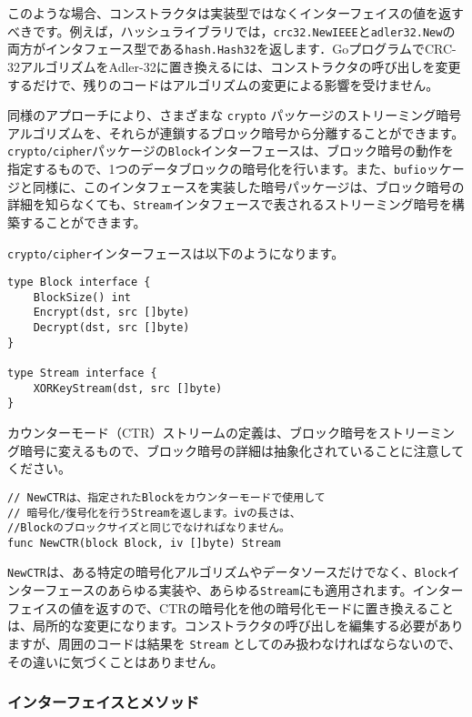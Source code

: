 \documentclass{jsarticle}
\begin{document}
このような場合、コンストラクタは実装型ではなくインターフェイスの値を返すべきです。例えば，ハッシュライブラリでは，\texttt{crc32.NewIEEE}と\texttt{adler32.New}の両方がインタフェース型である\texttt{hash.Hash32}を返します．GoプログラムでCRC-32アルゴリズムをAdler-32に置き換えるには、コンストラクタの呼び出しを変更するだけで、残りのコードはアルゴリズムの変更による影響を受けません。

同様のアプローチにより、さまざまな \texttt{crypto}
パッケージのストリーミング暗号アルゴリズムを、それらが連鎖するブロック暗号から分離することができます。\texttt{crypto/cipher}パッケージの\texttt{Block}インターフェースは、ブロック暗号の動作を指定するもので、1つのデータブロックの暗号化を行います。また、\texttt{bufio}ッケージと同様に、このインタフェースを実装した暗号パッケージは、ブロック暗号の詳細を知らなくても、\texttt{Stream}インタフェースで表されるストリーミング暗号を構築することができます。

\texttt{crypto/cipher}インターフェースは以下のようになります。

\begin{lstlisting}[numbers=none]
type Block interface {
    BlockSize() int
    Encrypt(dst, src []byte)
    Decrypt(dst, src []byte)
}

type Stream interface {
    XORKeyStream(dst, src []byte)
}
\end{lstlisting}

カウンターモード（CTR）ストリームの定義は、ブロック暗号をストリーミング暗号に変えるもので、ブロック暗号の詳細は抽象化されていることに注意してください。

\begin{lstlisting}[numbers=none]
// NewCTRは、指定されたBlockをカウンターモードで使用して
// 暗号化/復号化を行うStreamを返します。ivの長さは、
//Blockのブロックサイズと同じでなければなりません。
func NewCTR(block Block, iv []byte) Stream
\end{lstlisting}

\texttt{NewCTR}は、ある特定の暗号化アルゴリズムやデータソースだけでなく、\texttt{Block}インターフェースのあらゆる実装や、あらゆる\texttt{Stream}にも適用されます。インターフェイスの値を返すので、CTRの暗号化を他の暗号化モードに置き換えることは、局所的な変更になります。コンストラクタの呼び出しを編集する必要がありますが、周囲のコードは結果を
\texttt{Stream}
としてのみ扱わなければならないので、その違いに気づくことはありません。

\subsubsection{インターフェイスとメソッド}
\end{document}
